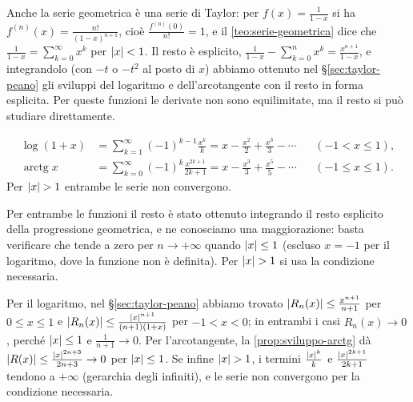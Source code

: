 Anche la serie geometrica è una serie di Taylor: per $f(x)=\frac1{1-x}$ si ha
$f^{(n)}(x)=\frac{n!}{(1-x)^{n+1}}$, cioè $\frac{f^{(n)}(0)}{n!}=1$, e il \cref{teo:serie-geometrica} dice che
$\frac1{1-x}=\sum_{k=0}^{\infty}x^{k}$ per $\lvert x\rvert<1$. Il resto è esplicito,
$\frac1{1-x}-\sum_{k=0}^{n}x^{k}=\frac{x^{n+1}}{1-x}$, e integrandolo (con $-t$ o $-t^{2}$ al posto di $x$) abbiamo
ottenuto nel \S\ref{sec:taylor-peano} gli sviluppi del logaritmo e dell'arcotangente con
il resto in forma esplicita. Per queste funzioni le derivate non sono equilimitate, ma
il resto si può studiare direttamente.

\begin{proposizione}\label{prop:serie-log-arctg}
\begin{align}
  \log(1+x)&=\sum_{k=1}^{\infty}(-1)^{k-1}\frac{x^{k}}k=x-\frac{x^{2}}2+\frac{x^{3}}3-\cdots
  && (-1<x\le1), \label{eq:serie-log}\\
  \operatorname{arctg}x&=\sum_{k=0}^{\infty}(-1)^{k}\frac{x^{2k+1}}{2k+1}=x-\frac{x^{3}}3+\frac{x^{5}}5-\cdots
  && (-1\le x\le1). \label{eq:serie-arctg}
\end{align}
Per $\lvert x\rvert>1$ entrambe le serie non convergono.
\end{proposizione}

\begin{schema}
\end{schema}

\begin{strategia}
Per entrambe le funzioni il resto è stato ottenuto integrando il resto esplicito della
progressione geometrica, e ne conosciamo una maggiorazione: basta verificare che tende a
zero per $n\to+\infty$ quando $\lvert x\rvert\le1$ (escluso $x=-1$ per il logaritmo, dove la funzione non
è definita). Per $\lvert x\rvert>1$ si usa la condizione necessaria.
\end{strategia}

\begin{dimostrazione}
Per il logaritmo, nel \S\ref{sec:taylor-peano} abbiamo trovato
$\lvert R_{n}(x)\rvert\le\frac{x^{n+1}}{n+1}$ per $0\le x\le1$ e $\lvert R_{n}(x)\rvert\le\frac{\lvert x\rvert^{n+1}}{(n+1)(1+x)}$ per $-1<x<0$; in
entrambi i casi $R_{n}(x)\to0$, perché $\lvert x\rvert\le1$ e $\frac1{n+1}\to0$. Per l'arcotangente, la
\cref{prop:sviluppo-arctg} dà $\lvert R(x)\rvert\le\frac{\lvert x\rvert^{2n+3}}{2n+3}\to0$ per $\lvert x\rvert\le1$. Se infine
$\lvert x\rvert>1$, i termini $\frac{\lvert x\rvert^{k}}k$ e $\frac{\lvert x\rvert^{2k+1}}{2k+1}$ tendono a $+\infty$ (gerarchia degli
infiniti), e le serie non convergono per la condizione necessaria.
\end{dimostrazione}

